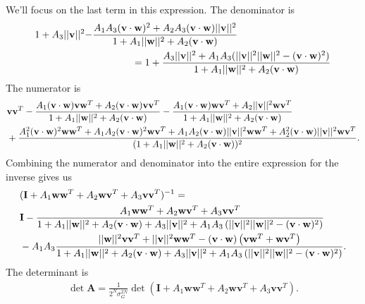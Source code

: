 \documentclass[11pt]{article}
\begin{document}
We'll focus on the last term in this expression. The denominator is 
\begin{align}
1 + A_3 ||\mathbf{v}||^2 - &\frac{A_1A_3(\mathbf{v} \cdot \mathbf{w})^2 + A_2A_3(\mathbf{v}\cdot\mathbf{w})||\mathbf{v}||^2}{1 + A_1 ||\mathbf{w}||^2 + A_2 (\mathbf{v}\cdot \mathbf{w})} \notag \\
&\qquad \qquad = 1 + \frac{A_3 ||\mathbf{v}||^2 + A_1 A_3 (||\mathbf{v}||^2 ||\mathbf{w}||^2 - (\mathbf{v}\cdot \mathbf{w})^2)}{1 + A_1 ||\mathbf{w}||^2 + A_2 (\mathbf{v}\cdot\mathbf{w})}
\end{align}
The numerator is 
\begin{align}
	&\mathbf{vv}^T - \frac{A_1 (\mathbf{v}\cdot\mathbf{w}) \mathbf{vw}^T + A_2 (\mathbf{v}\cdot \mathbf{w}) \mathbf{vv}^T}{1 + A_1 ||\mathbf{w}||^2 + A_2 (\mathbf{v}\cdot\mathbf{w})} - \frac{A_1(\mathbf{v}\cdot\mathbf{w}) \mathbf{wv}^T + A_2 ||\mathbf{v}||^2 \mathbf{wv}^T}{1 + A_1 ||\mathbf{w}||^2 + A_2 (\mathbf{v}\cdot\mathbf{w})} \notag \\
	&+ \frac{A_1^2 (\mathbf{v}\cdot\mathbf{w})^2\mathbf{ww}^T+ A_1 A_2 (\mathbf{v}\cdot\mathbf{w})^2 \mathbf{wv}^T + A_1 A_2(\mathbf{v}\cdot\mathbf{w}) ||\mathbf{v}||^2\mathbf{ww}^T + A_2^2(\mathbf{v}\cdot\mathbf{w})||\mathbf{v}||^2 \mathbf{wv}^T}{(1 + A_1 ||\mathbf{w}||^2 + A_2 (\mathbf{v}\cdot\mathbf{w}))^2}.
\end{align}
Combining the numerator and denominator into the entire expression for the inverse gives us
\begin{align}
	&(\mathbf{I} + A_1 \mathbf{ww}^T + A_2 \mathbf{wv}^T + A_3 \mathbf{vv}^T)^{-1} =  \notag \\
	& \mathbf{I} - \frac{A_1 \mathbf{ww}^T + A_2 \mathbf{wv}^T + A_3 \mathbf{vv}^T}{1 + A_1 ||\mathbf{w}||^2 + A_2 (\mathbf{v}\cdot\mathbf{w}) + A_3 ||\mathbf{v}||^2 +A_1 A_3 \left(||\mathbf{v}||^2||\mathbf{w}||^2 - (\mathbf{v}\cdot\mathbf{w})^2\right)} \notag \\
	&- A_1 A_3\frac{||\mathbf{w}||^2 \mathbf{vv}^T + ||\mathbf{v}||^2 \mathbf{ww}^T -(\mathbf{v}\cdot \mathbf{w}) \left(\mathbf{vw}^T +\mathbf{wv}^T\right)}{1 + A_1 ||\mathbf{w}||^2 + A_2 (\mathbf{v}\cdot\mathbf{w}) + A_3 ||\mathbf{v}||^2 +A_1 A_3 \left(||\mathbf{v}||^2||\mathbf{w}||^2 - (\mathbf{v}\cdot\mathbf{w})^2\right)}.
\end{align}
The determinant is 
\begin{align}
	\det \mathbf{A} = \frac{1}{2^N \sigma_G^{2N}} \det \left(\mathbf{I}+ A_1 \mathbf{ww}^T + A_2 \mathbf{wv}^T + A_3 \mathbf{vv}^T\right).
\end{align}
\end{document}
